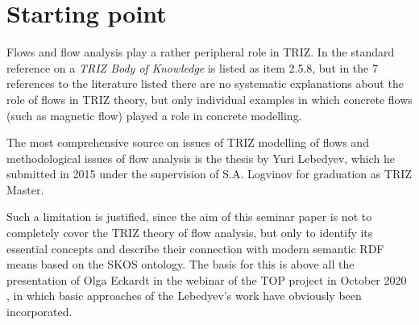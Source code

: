 \documentclass[a4paper,11pt]{article}
\begin{document}
    \section{Starting point} 

    Flows and flow analysis play a rather peripheral role in TRIZ.  In the
    standard reference \cite{Petrov2007} on a \emph{TRIZ Body of Knowledge} is
    listed as item 2.5.8, but in the 7 references to the literature listed there
    are no systematic explanations about the role of flows in TRIZ theory, but
    only individual examples in which concrete flows (such as magnetic flow)
    played a role in concrete modelling.

    The most comprehensive source on issues of TRIZ modelling of flows and
    methodological issues of flow analysis is the thesis \cite{Lebedyev2011} by
    Yuri Lebedyev, which he submitted in 2015 under the supervision of S.A. 
    Logvinov for graduation as TRIZ Master.

    Such a limitation is justified, since the aim of this seminar paper is not to
    completely cover the TRIZ theory of flow analysis, but only to identify its
    essential concepts and describe their connection with modern semantic RDF
    means based on the SKOS ontology. The basis for this is above all the
    presentation of Olga Eckardt in the webinar of the TOP project in October 2020
    \cite{Eckardt2020}, in which basic approaches of the Lebedyev's work have
    obviously been incorporated.
\end{document}
